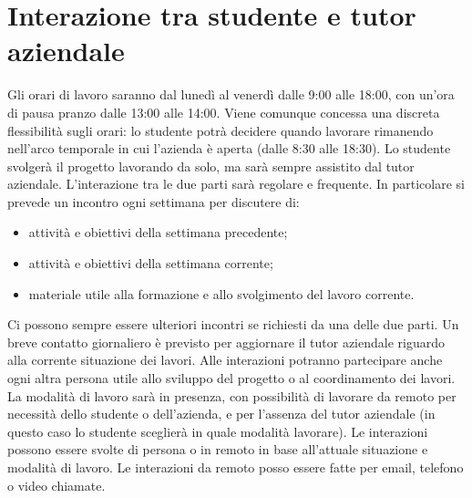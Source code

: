 \section*{Interazione tra studente e tutor aziendale}
Gli orari di lavoro saranno dal lunedì al venerdì dalle 9:00 alle 18:00, con un'ora di pausa pranzo dalle 13:00 alle 14:00. Viene comunque concessa una discreta flessibilità sugli orari: lo studente potrà decidere quando lavorare rimanendo nell'arco temporale in cui l'azienda è aperta (dalle 8:30 alle 18:30). Lo studente svolgerà il progetto lavorando da solo, ma sarà sempre assistito dal tutor aziendale. L'interazione tra le due parti sarà regolare e frequente. In particolare si prevede un incontro ogni settimana per discutere di:
\begin{itemize}
    \item attività e obiettivi della settimana precedente;
    \item attività e obiettivi della settimana corrente;
    \item materiale utile alla formazione e allo svolgimento del lavoro corrente.
\end{itemize}
Ci possono sempre essere ulteriori incontri se richiesti da una delle due parti. Un breve contatto giornaliero è previsto per aggiornare il tutor aziendale riguardo alla corrente situazione dei lavori. 
Alle interazioni potranno partecipare anche ogni altra persona utile allo sviluppo del progetto o al coordinamento dei lavori.
\newline
La modalità di lavoro sarà in presenza, con possibilità di lavorare da remoto per necessità dello studente o dell'azienda, e per l'assenza del tutor aziendale (in questo caso lo studente sceglierà in quale modalità lavorare). Le interazioni possono essere svolte di persona o in remoto in base all'attuale situazione e modalità di lavoro. Le interazioni da remoto posso essere fatte per email, telefono o video chiamate.